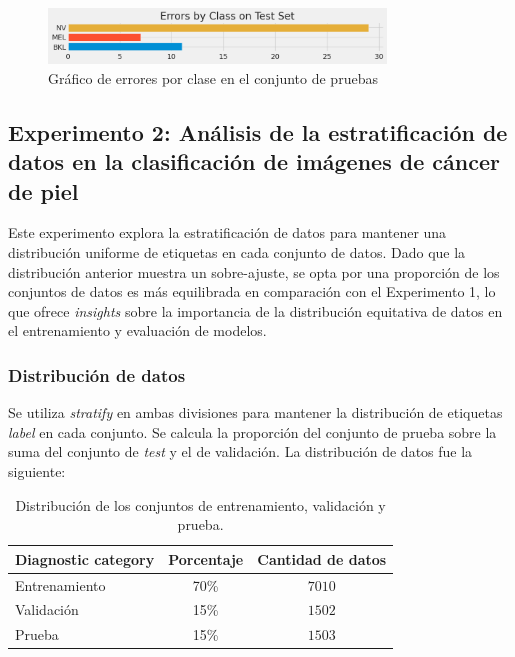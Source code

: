 \begin{figure}[H]
   \begin{center}
       \includegraphics[width=0.8\textwidth]{./Graphics/errorByClass_p1.png}
       \caption{Gráfico de errores por clase en el conjunto de pruebas\label{fig:class_errors_p1}}
   \end{center}
\end{figure} 

\subsection{Experimento 2: Análisis de la estratificación de datos en la clasificación de imágenes de cáncer de piel}

Este experimento explora la estratificación de datos para mantener una distribución uniforme de etiquetas en cada conjunto de datos. Dado que la distribución anterior muestra un sobre-ajuste, se opta por una proporción de los conjuntos de datos es más equilibrada en comparación con el Experimento 1, lo que ofrece \textit{insights} sobre la importancia de la distribución equitativa de datos en el entrenamiento y evaluación de modelos.

\subsubsection*{Distribución de datos}

Se utiliza \textit{stratify} en ambas divisiones para mantener la distribución de etiquetas \textit{label} en cada conjunto. Se calcula la proporción del conjunto de prueba sobre la suma del conjunto de \textit{test} y el de validación. La distribución de datos fue la siguiente:

   \begin{table}[H]
      \centering
      \begin{tabular}{lcc}
      \hline
      \textbf{Diagnostic category} & \textbf{Porcentaje} & \textbf{Cantidad de datos} \\
      \hline
      Entrenamiento       & 70\% &  $7010$ \\
      Validación      & 15\% & $1502$  \\
      Prueba      & 15\% & $1503$  \\ \hline
      \end{tabular}
      \caption{Distribución de los conjuntos de entrenamiento, validación y prueba.}
      \label{table:data_distribution_e2}
      \end{table}


